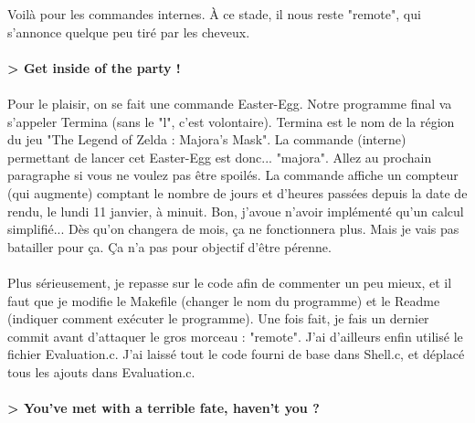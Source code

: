 Voilà pour les commandes internes. À ce stade, il nous reste "remote", qui s'annonce quelque peu tiré par les cheveux.
\\\\
\textbf{> Get inside of the party !}
\\\\
Pour le plaisir, on se fait une commande Easter-Egg. Notre programme final va s'appeler Termina (sans le "l", c'est volontaire). Termina est le nom de la région du jeu "The Legend of Zelda : Majora's Mask". La commande (interne) permettant de lancer cet Easter-Egg est donc... "majora". Allez au prochain paragraphe si vous ne voulez pas être spoilés. La commande affiche un compteur (qui augmente) comptant le nombre de jours et d'heures passées depuis la date de rendu, le lundi 11 janvier, à minuit. Bon, j'avoue n'avoir implémenté qu'un calcul simplifié... Dès qu'on changera de mois, ça ne fonctionnera plus. Mais je vais pas batailler pour ça. Ça n'a pas pour objectif d'être pérenne.
\\\\
Plus sérieusement, je repasse sur le code afin de commenter un peu mieux, et il faut que je modifie le Makefile (changer le nom du programme) et le Readme (indiquer comment exécuter le programme). Une fois fait, je fais un dernier commit avant d'attaquer le gros morceau : "remote". J'ai d'ailleurs enfin utilisé le fichier Evaluation.c. J'ai laissé tout le code fourni de base dans Shell.c, et déplacé tous les ajouts dans Evaluation.c.
\\\\
\textbf{> You've met with a terrible fate, haven't you ?}




















